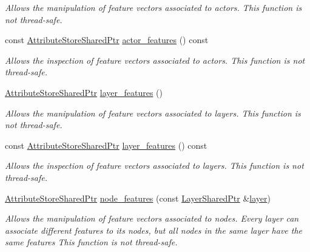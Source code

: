 \begin{DoxyCompactItemize}
\begin{DoxyCompactList}\small\item\em Allows the manipulation of feature vectors associated to actors. This function is not thread-\/safe. \end{DoxyCompactList}\item 
const \hyperlink{namespacemlnet_a3d60b9ef6ef6489d000f6061e0a1bdf2}{Attribute\+Store\+Shared\+Ptr} \hyperlink{classmlnet_1_1_m_l_network_a6bb89ed6554e96acd80ba8126dd0afa8}{actor\+\_\+features} () const 
\begin{DoxyCompactList}\small\item\em Allows the inspection of feature vectors associated to actors. This function is not thread-\/safe. \end{DoxyCompactList}\item 
\hyperlink{namespacemlnet_a3d60b9ef6ef6489d000f6061e0a1bdf2}{Attribute\+Store\+Shared\+Ptr} \hyperlink{classmlnet_1_1_m_l_network_a4ee8a60c348feed04577ae8c9060edf8}{layer\+\_\+features} ()
\begin{DoxyCompactList}\small\item\em Allows the manipulation of feature vectors associated to layers. This function is not thread-\/safe. \end{DoxyCompactList}\item 
const \hyperlink{namespacemlnet_a3d60b9ef6ef6489d000f6061e0a1bdf2}{Attribute\+Store\+Shared\+Ptr} \hyperlink{classmlnet_1_1_m_l_network_aa9074cba205ceabc3c0f39a340716935}{layer\+\_\+features} () const 
\begin{DoxyCompactList}\small\item\em Allows the inspection of feature vectors associated to layers. This function is not thread-\/safe. \end{DoxyCompactList}\item 
\hyperlink{namespacemlnet_a3d60b9ef6ef6489d000f6061e0a1bdf2}{Attribute\+Store\+Shared\+Ptr} \hyperlink{classmlnet_1_1_m_l_network_aac41608b673450acca904619cc77d9b2}{node\+\_\+features} (const \hyperlink{namespacemlnet_a10c007fb811c55339dd5b9d32bb0505d}{Layer\+Shared\+Ptr} \&\hyperlink{classmlnet_1_1layer}{layer})
\begin{DoxyCompactList}\small\item\em Allows the manipulation of feature vectors associated to nodes. Every layer can associate different features to its nodes, but all nodes in the same layer have the same features This function is not thread-\/safe. \end{DoxyCompactList}\item 

\end{DoxyCompactItemize}
